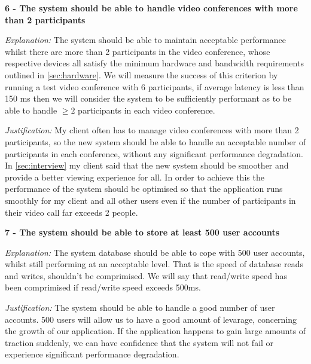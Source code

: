 \vspace{0.2cm}

\textsf{\bfseries 6 - The system should be able to handle video 
conferences with more than 2 participants}

\vspace{0.1cm}

\textit{Explanation:}
The system should be able to maintain acceptable performance
whilst there are more than 2 participants in the video 
conference, whose respective devices all satisfy the minimum
hardware and bandwidth requirements outlined in 
\ref{sec:hardware}. We will measure the success of this 
criterion by running a test video conference with 6 
participants, if average latency is less than 150 ms then we
will consider the system to be sufficiently performant as to 
be able to handle $\geq 2$ participants in each video
conference.
\vspace{0.1cm}

\textit{Justification:}
My client often has to manage video conferences with more than
2 participants, so the new system should be able to handle an 
acceptable number of participants in each conference, without
any significant performance degradation. In
\ref{sec:interview} my client said that the new system 
should be smoother and provide a better viewing experience 
for all. In order to achieve this the performance of the 
system should be optimised so that the application runs 
smoothly for my client and all other users even if the
number of participants in their video call far exceeds 2 
people.

\vspace{0.2cm}

\textsf{\bfseries 7 - The system should be able to store at 
least 500 user accounts}

\vspace{0.1cm}

\textit{Explanation:}
The system database should be able to cope with 500 user 
accounts, whilst still performing at an acceptable level.
That is the speed of database reads and writes, shouldn't
be comprimised. We will say that read/write speed has been 
comprimised if read/write speed exceeds 500ms.
\vspace{0.1cm}

\textit{Justification:}
The system should be able to handle a good number of user 
accounts. 500 users will allow us to have a good amount of 
levarage, concerning the growth of our application. If the 
application happens to gain large amounts of traction
suddenly, we can have confidence that the system will not 
fail or experience significant performance degradation.
